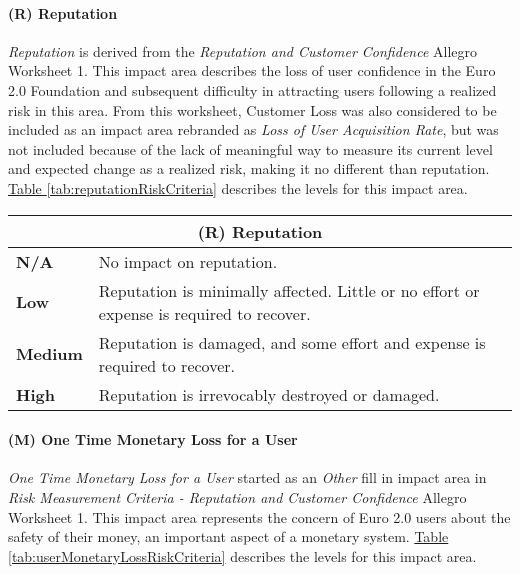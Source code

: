 \documentclass[12pt]{article} %
\newcommand{\hypertableref}[1]{\hyperref[#1]{Table \ref{#1}}}
\begin{document}
{\paragraph{(R) Reputation}

\textit{Reputation} is derived from the \textit{Reputation and Customer Confidence} Allegro Worksheet 1. This impact area describes the loss of user confidence in the Euro 2.0 Foundation and subsequent difficulty in attracting users following a realized risk in this area. From this worksheet, Customer Loss was also considered to be included as an impact area rebranded as \textit{Loss of User Acquisition Rate}, but was not included because of the lack of meaningful way to measure its current level and expected change as a realized risk, making it no different than reputation. \hypertableref{tab:reputationRiskCriteria} describes the levels for this impact area.

\begin{center}
\begin{tabular}{ | l | p{12cm} | }
  \hline
  \multicolumn{2}{|c|}{\textbf{(R) Reputation}}
  \\ \hline
  \textbf{N/A} & No impact on reputation.
  \\ \hline
  \textbf{Low} & Reputation is minimally affected. Little or no effort or expense is required to recover.
  \\ \hline
  \textbf{Medium} & Reputation is damaged, and some effort and expense is required to recover.
  \\ \hline
  \textbf{High} & Reputation is irrevocably destroyed or damaged.
  \\ \hline
\end{tabular}
\end{center}
\label{tab:reputationRiskCriteria}

\paragraph{(M) One Time Monetary Loss for a User}

\textit{One Time Monetary Loss for a User} started as an \textit{Other} fill in impact area in \textit{Risk Measurement Criteria - Reputation and Customer Confidence} Allegro Worksheet 1. This impact area represents the concern of Euro 2.0 users about the safety of their money, an important aspect of a monetary system. \hypertableref{tab:userMonetaryLossRiskCriteria} describes the levels for this impact area.

}
\end{document}
